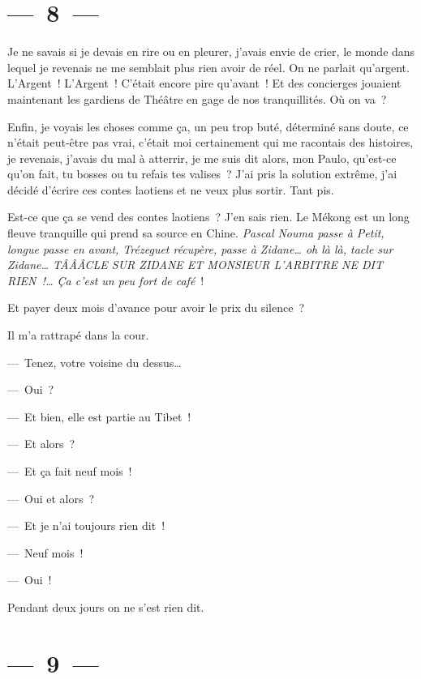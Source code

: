 \documentclass[french,twoside]{book} %
\begin{document}
\section[{— 8 —}]{— 8 —}
\renewcommand{\leftmark}{— 8 —}

\noindent Je ne savais si je devais en rire ou en pleurer, j’avais envie de crier, le monde dans lequel je revenais ne me semblait plus rien avoir de réel. On ne parlait qu’argent. L’Argent ! L’Argent ! C’était encore pire qu’avant ! Et des concierges jouaient maintenant les gardiens de Théâtre en gage de nos tranquillités. Où on va ?\par
Enfin, je voyais les choses comme ça, un peu trop buté, déterminé sans doute, ce n’était peut-être pas vrai, c’était moi certainement qui me racontais des histoires, je revenais, j’avais du mal à atterrir, je me suis dit alors, mon Paulo, qu’est-ce qu’on fait, tu bosses ou tu refais tes valises ? J’ai pris la solution extrême, j’ai décidé d’écrire ces contes laotiens et ne veux plus sortir. Tant pis.\par
Est-ce que ça se vend des contes laotiens ? J’en sais rien. Le Mékong est un long fleuve tranquille qui prend sa source en Chine. \emph{Pascal Nouma passe à Petit, longue passe en avant, Trézeguet récupère, passe à Zidane… oh là là, tacle sur Zidane… TÂÂÂCLE SUR ZIDANE ET MONSIEUR L’ARBITRE NE DIT RIEN !… Ça c’est un peu fort de café} !\par
Et payer deux mois d’avance pour avoir le prix du silence ?\par
Il m’a rattrapé dans la cour.\par
— Tenez, votre voisine du dessus…\par
— Oui ?\par
— Et bien, elle est partie au Tibet !\par
— Et alors ?\par
— Et ça fait neuf mois !\par
— Oui et alors ?\par
— Et je n’ai toujours rien dit !\par
— Neuf mois !\par
— Oui !\par
Pendant deux jours on ne s’est rien dit.

\section[{— 9 —}]{— 9 —}
\renewcommand{\leftmark}{— 9 —}
\end{document}
